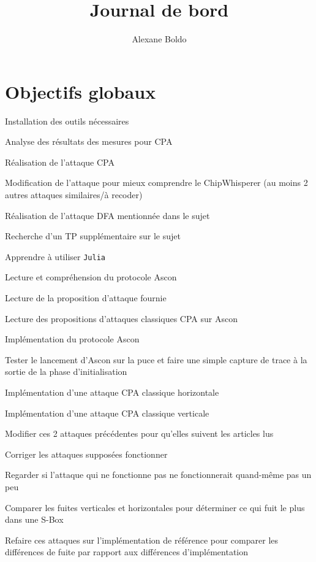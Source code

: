 \documentclass[12pt]{article}
\author{Alexane Boldo}
\title{Journal de bord}
\newcommand{\cmark}{\ding{51}}%
\newcommand{\done}{\rlap{$\square$}{\raisebox{2pt}{\large\hspace{1pt}\cmark}}%
	\hspace{-2.5pt}}
\begin{document}
	\maketitle
	
	\tableofcontents
	\section{Objectifs globaux}
	\begin{todolist}
		\item[\done] Installation des outils nécessaires
		\item[\done] Analyse des résultats des mesures pour CPA
		\item[\done] Réalisation de l'attaque CPA
		\item[\done] Modification de l'attaque pour mieux comprendre le ChipWhisperer (au moins 2 autres attaques similaires/à recoder)
		\item[\done] Réalisation de l'attaque DFA mentionnée dans le sujet
		\item[\done] Recherche d'un TP supplémentaire sur le sujet
		\item[\done] Apprendre à utiliser \verb|Julia|
		\item[\done] Lecture et compréhension du protocole Ascon
		\item[\done] Lecture de la proposition d'attaque fournie
		\item[\done] Lecture des propositions d'attaques classiques CPA sur Ascon
		\item[\done] Implémentation du protocole Ascon
		\item[\done] Tester le lancement d'Ascon sur la puce et faire une simple capture de trace à la sortie de la phase d'initialisation
		\item[\done] Implémentation d'une attaque CPA classique horizontale
		\item[\done] Implémentation d'une attaque CPA classique verticale
		\item[\done] Modifier ces 2 attaques précédentes pour qu'elles suivent les articles lus
		\item Corriger les attaques supposées fonctionner
		\item[\done] Regarder si l'attaque qui ne fonctionne pas ne fonctionnerait quand-même pas un peu
		\item[\done] Comparer les fuites verticales et horizontales pour déterminer ce qui fuit le plus dans une S-Box
		\item[\done] Refaire ces attaques sur l'implémentation de référence pour comparer les différences de fuite par rapport aux différences d'implémentation

\end{todolist}
\end{document}
